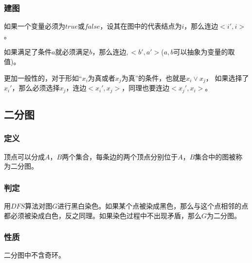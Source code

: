 \documentclass[11pt]{article}
\begin{document}
\subsubsection{建图}
\label{sec:org8f09f17}

如果一个变量必须为\(true\)或\(false\)，设其在图中的代表结点为\(i\)，那么连边\(<i',i>\)。

如果满足了条件\(a\)就必须满足\(b\)，那么连边\(<a,b>,<b',a'>\)(\(a,b\)可以抽象为变量的取值)。

更加一般性的，对于形如“\(x_i\)为真或者\(x_j\)为真”的条件，也就是\(x_i \vee x_j\)， 如果选择了\(x_i'\)，那么必须选择\(x_j\)，连边\(<x_i',x_j>\)，同理也要连边\(<x_j',x_i>\)。
\subsection{二分图}
\label{sec:orgcddbe23}
\subsubsection{定义}
\label{sec:org72fdfd9}

顶点可以分成\(A\)，\(B\)两个集合，每条边的两个顶点分别位于\(A\)，\(B\)集合中的图被称为二分图。

\subsubsection{判定}
\label{sec:orga3e69a1}

用\(DFS\)算法对图\(G\)进行黑白染色。如果某个点被染成黑色，那么与这个点相邻的点都必须被染成白色，反之同理。如果染色过程中不出现矛盾，那么\(G\)为二分图。

\subsubsection{性质}
\label{sec:orgee104c8}

二分图中不含奇环。
\end{document}
